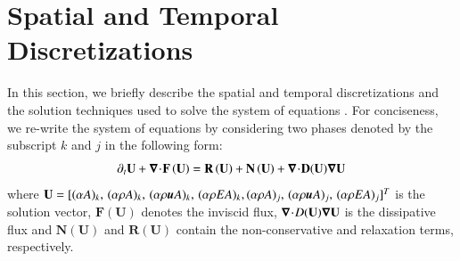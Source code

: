 \documentclass[preprint,10pt]{elsarticle}
\begin{document}
\section{Spatial and Temporal Discretizations} \label{sec:disc}
%
In this section, we briefly describe the spatial and temporal discretizations and the solution techniques 
used to solve the system of equations . For conciseness, we re-write the system of 
equations by considering two phases denoted by the subscript $k$ and $j$ in the following form:
\begin{equation}
\label{eq:form}
\partial_t \mathbf{U} + \boldsymbol\nabla\! \cdot \! \mathbf{F} \left( \mathbf{U} \right) = \mathbf{R} \left( \mathbf{U} \right) + \mathbf{N} \left( \mathbf{U} \right) + \boldsymbol\nabla\! \cdot \! 
\mathbf{D}(\mathbf{U}) \boldsymbol\nabla \mathbf{U}
\end{equation}
where $\mathbf{U}=[(\alpha A )_k, \, (\alpha \rho A)_k,\, (\alpha \rho \boldsymbol u A)_k,\, (\alpha \rho E A)_k, (\alpha \rho A)_j,\, (\alpha \rho \boldsymbol u A)_j,\, (\alpha \rho E A)_j]^T$ is the solution vector, $\mathbf{F} 
\left( \mathbf{U} \right)$ denotes 
the inviscid flux, $\boldsymbol\nabla\! \cdot \! D (\mathbf{U}) \boldsymbol\nabla \mathbf{U}$ is the dissipative flux and $\mathbf{N} \left( \mathbf{U} \right)$ and $\mathbf{R} 
\left( \mathbf{U} \right)$ contain the non-conservative and relaxation terms, respectively. 
\end{document}
